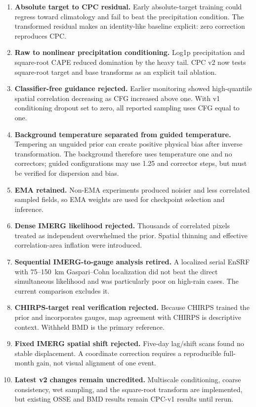 \documentclass[10pt,twocolumn]{article}
\begin{document}
\begin{enumerate}
\item \textbf{Absolute target to CPC residual.} Early absolute-target training could regress toward climatology and fail to beat the precipitation condition. The transformed residual makes an identity-like baseline explicit: zero correction reproduces CPC.
\item \textbf{Raw to nonlinear precipitation conditioning.} Log1p precipitation and square-root CAPE reduced domination by the heavy tail. CPC v2 now tests square-root target and base transforms as an explicit tail ablation.
\item \textbf{Classifier-free guidance rejected.} Earlier monitoring showed high-quantile spatial correlation decreasing as CFG increased above one. With v1 conditioning dropout set to zero, all reported sampling uses CFG equal to one.
\item \textbf{Background temperature separated from guided temperature.} Tempering an unguided prior can create positive physical bias after inverse transformation. The background therefore uses temperature one and no correctors; guided configurations may use 1.25 and corrector steps, but must be verified for dispersion and bias.
\item \textbf{EMA retained.} Non-EMA experiments produced noisier and less correlated sampled fields, so EMA weights are used for checkpoint selection and inference.
\item \textbf{Dense IMERG likelihood rejected.} Thousands of correlated pixels treated as independent overwhelmed the prior. Spatial thinning and effective correlation-area inflation were introduced.
\item \textbf{Sequential IMERG-to-gauge analysis retired.} A localized serial EnSRF with 75--150~km Gaspari--Cohn localization \cite{gaspari1999,whitaker2002} did not beat the direct simultaneous likelihood and was particularly poor on high-rain cases. The current comparison excludes it.
\item \textbf{CHIRPS-target real verification rejected.} Because CHIRPS trained the prior and incorporates gauges, map agreement with CHIRPS is descriptive context. Withheld BMD is the primary reference.
\item \textbf{Fixed IMERG spatial shift rejected.} Five-day lag/shift scans found no stable displacement. A coordinate correction requires a reproducible full-month gain, not visual alignment of one event.
\item \textbf{Latest v2 changes remain uncredited.} Multiscale conditioning, coarse consistency, wet sampling, and the square-root transform are implemented, but existing OSSE and BMD results remain CPC-v1 results until rerun.
\end{enumerate}
\end{document}
